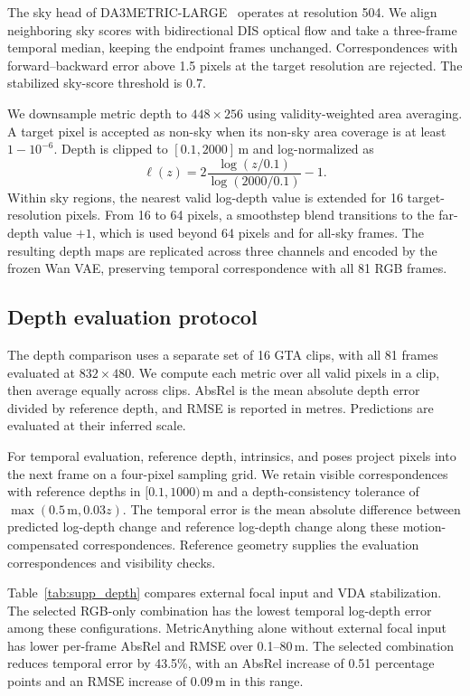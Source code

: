 The sky head of DA3METRIC-LARGE~\cite{lin2025depthanything3} operates at resolution 504.
We align neighboring sky scores with bidirectional DIS optical flow and take a three-frame temporal median, keeping the endpoint frames unchanged.
Correspondences with forward--backward error above 1.5 pixels at the target resolution are rejected.
The stabilized sky-score threshold is 0.7.

We downsample metric depth to $448\!\times\!256$ using validity-weighted area averaging.
A target pixel is accepted as non-sky when its non-sky area coverage is at least $1-10^{-6}$.
Depth is clipped to $[0.1,2000]$\,m and log-normalized as
\begin{equation}
    \ell(z) = 2\frac{\log(z/0.1)}{\log(2000/0.1)}-1.
\end{equation}
Within sky regions, the nearest valid log-depth value is extended for 16 target-resolution pixels.
From 16 to 64 pixels, a smoothstep blend transitions to the far-depth value $+1$, which is used beyond 64 pixels and for all-sky frames.
The resulting depth maps are replicated across three channels and encoded by the frozen Wan VAE, preserving temporal correspondence with all 81 RGB frames.

\subsection{Depth evaluation protocol}

The depth comparison uses a separate set of 16 GTA clips, with all 81 frames evaluated at $832\!\times\!480$.
We compute each metric over all valid pixels in a clip, then average equally across clips.
AbsRel is the mean absolute depth error divided by reference depth, and RMSE is reported in metres.
Predictions are evaluated at their inferred scale.

For temporal evaluation, reference depth, intrinsics, and poses project pixels into the next frame on a four-pixel sampling grid.
We retain visible correspondences with reference depths in $[0.1,1000)$\,m and a depth-consistency tolerance of $\max(0.5\,\mathrm{m},0.03z)$.
The temporal error is the mean absolute difference between predicted log-depth change and reference log-depth change along these motion-compensated correspondences.
Reference geometry supplies the evaluation correspondences and visibility checks.

Table~\ref{tab:supp_depth} compares external focal input and VDA stabilization.
The selected RGB-only combination has the lowest temporal log-depth error among these configurations.
MetricAnything alone without external focal input has lower per-frame AbsRel and RMSE over 0.1--80\,m.
The selected combination reduces temporal error by 43.5\%, with an AbsRel increase of 0.51 percentage points and an RMSE increase of 0.09\,m in this range.

